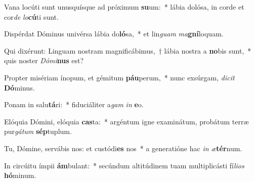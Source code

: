 \item Vana locúti sunt unusquísque ad próximum \textbf{su}um:~* lábia dolósa, in corde et cor\textit{de} \textit{lo}\textbf{cú}ti sunt.
\item Dispérdat Dóminus univérsa lábia do\textbf{ló}sa,~* et lin\textit{guam} \textit{ma}\textbf{gní}loquam.
\item Qui dixérunt: Linguam nostram magnificábimus,~† lábia nostra a \textbf{no}bis sunt,~* quis noster \textit{Dó}\textit{mi}\textbf{nus} est?
\item Propter misériam ínopum, et gémitum \textbf{páu}perum,~* nunc exsúrgam, \textit{di}\textit{cit} \textbf{Dó}minus.
\item Ponam in salu\textbf{tá}ri:~* fiduciáliter a\textit{gam} \textit{in} \textbf{e}o.
\item Elóquia Dómini, elóquia \textbf{cas}ta:~* argéntum igne examinátum, probátum terræ pur\textit{gá}\textit{tum} \textbf{sép}tuplum.
\item Tu, Dómine, servábis nos: et custódi\textbf{es} nos~* a generatióne hac \textit{in} \textit{æ}\textbf{tér}num.
\item In circúitu ímpii \textbf{ám}bulant:~* secúndum altitúdinem tuam multiplicásti fí\textit{li}\textit{os} \textbf{hó}minum.
